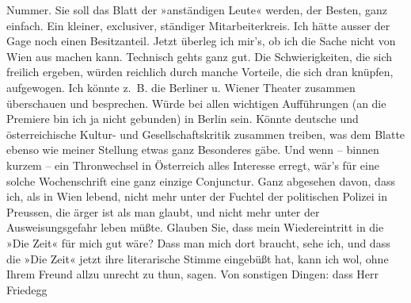 \begin{ledgroupsized}[t]{13cm}
               Nummer. Sie soll das Blatt der »anständigen Leute« werden, der Besten, ganz einfach.
               Ein kleiner, exclusiver, ständiger Mitarbeiterkreis. Ich hätte ausser der Gage noch
               einen Besitzanteil. Jetzt überleg ich mir’s, ob ich die Sache nicht von Wien aus machen kann. Technisch gehts ganz gut. Die
               Schwierigkeiten, die sich freilich ergeben, würden reichlich durch manche Vorteile,
                  {\pb}die sich dran knüpfen,
               aufgewogen. Ich könnte z. B. die Berliner u. Wiener Theater zusammen überschauen und besprechen.
               Würde bei allen wichtigen Aufführungen (an die Premiere bin ich ja nicht gebunden) in
                  Berlin sein. Könnte deutsche und österreichische Kultur- und Gesellschaftskritik zusammen treiben, was dem
               Blatte ebenso wie meiner Stellung etwas ganz Besonderes gäbe. Und wenn – binnen
               kurzem – ein Thronwechsel in Österreich alles
               Interesse erregt, wär’s für eine solche Wochenschrift eine ganz einzige Conjunctur.
               Ganz abgesehen davon, dass ich, als in Wien
               lebend, nicht mehr unter der Fuchtel der politischen Polizei in Preussen, die ärger ist als man glaubt, und nicht mehr unter
               der Ausweisungsgefahr leben müßte. \pend
           \pstart
           Glauben Sie, dass mein Wiedereintritt in die »Die
                  Zeit« für mich gut wäre? Dass man mich dort braucht, sehe ich, und dass die
                  »Die Zeit« jetzt ihre literarische Stimme
               eingebüßt hat, kann ich wol, ohne Ihrem Freund \label{K_L03430-2v}\label{K_L03430-2h} allzu unrecht zu thun, sagen. \pend
           \pstart
           Von sonstigen Dingen: dass Herr Friedegg

\end{ledgroupsized}
